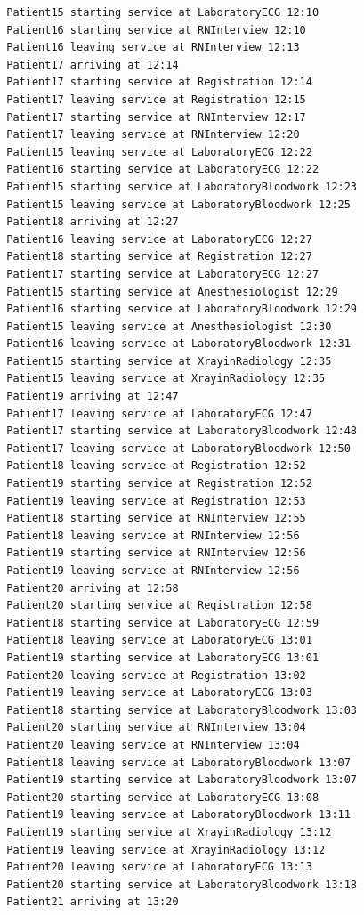 \documentclass[12pt]{article}
\begin{document}
\begin{verbatim}
		Patient15 starting service at LaboratoryECG 12:10
		Patient16 starting service at RNInterview 12:10
		Patient16 leaving service at RNInterview 12:13
		Patient17 arriving at 12:14
		Patient17 starting service at Registration 12:14
		Patient17 leaving service at Registration 12:15
		Patient17 starting service at RNInterview 12:17
		Patient17 leaving service at RNInterview 12:20
		Patient15 leaving service at LaboratoryECG 12:22
		Patient16 starting service at LaboratoryECG 12:22
		Patient15 starting service at LaboratoryBloodwork 12:23
		Patient15 leaving service at LaboratoryBloodwork 12:25
		Patient18 arriving at 12:27
		Patient16 leaving service at LaboratoryECG 12:27
		Patient18 starting service at Registration 12:27
		Patient17 starting service at LaboratoryECG 12:27
		Patient15 starting service at Anesthesiologist 12:29
		Patient16 starting service at LaboratoryBloodwork 12:29
		Patient15 leaving service at Anesthesiologist 12:30
		Patient16 leaving service at LaboratoryBloodwork 12:31
		Patient15 starting service at XrayinRadiology 12:35
		Patient15 leaving service at XrayinRadiology 12:35
		Patient19 arriving at 12:47
		Patient17 leaving service at LaboratoryECG 12:47
		Patient17 starting service at LaboratoryBloodwork 12:48
		Patient17 leaving service at LaboratoryBloodwork 12:50
		Patient18 leaving service at Registration 12:52
		Patient19 starting service at Registration 12:52
		Patient19 leaving service at Registration 12:53
		Patient18 starting service at RNInterview 12:55
		Patient18 leaving service at RNInterview 12:56
		Patient19 starting service at RNInterview 12:56
		Patient19 leaving service at RNInterview 12:56
		Patient20 arriving at 12:58
		Patient20 starting service at Registration 12:58
		Patient18 starting service at LaboratoryECG 12:59
		Patient18 leaving service at LaboratoryECG 13:01
		Patient19 starting service at LaboratoryECG 13:01
		Patient20 leaving service at Registration 13:02
		Patient19 leaving service at LaboratoryECG 13:03
		Patient18 starting service at LaboratoryBloodwork 13:03
		Patient20 starting service at RNInterview 13:04
		Patient20 leaving service at RNInterview 13:04
		Patient18 leaving service at LaboratoryBloodwork 13:07
		Patient19 starting service at LaboratoryBloodwork 13:07
		Patient20 starting service at LaboratoryECG 13:08
		Patient19 leaving service at LaboratoryBloodwork 13:11
		Patient19 starting service at XrayinRadiology 13:12
		Patient19 leaving service at XrayinRadiology 13:12
		Patient20 leaving service at LaboratoryECG 13:13
		Patient20 starting service at LaboratoryBloodwork 13:18
		Patient21 arriving at 13:20

\end{verbatim}
\end{document}

